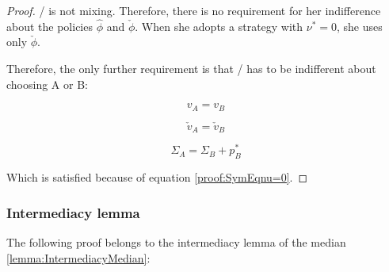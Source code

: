 \documentclass{article}
\theoremstyle{definition}
\begin{document}
\begin{proof}
\PI/ is not mixing. Therefore, there is no requirement for her indifference about the policies  $\hat{\phi}$ and $\check{\phi}$. When she adopts a strategy with $\nu^* = 0$, she uses only $\check{\phi}$.

Therefore, the only further requirement is that \PII/ has to be indifferent about choosing A or B:

\begin{equation}
    v_A = v_B
\end{equation}

\begin{equation}
    \check{v}_A = \check{v}_B
\end{equation}

\begin{equation}
    \Sigma_A = \Sigma_B + p^*_B
\end{equation}

Which is satisfied because of equation \ref{proof:SymEqnu=0}.

\end{proof}

\subsubsection{Intermediacy lemma}
\label{sec:IntermediacyMedian}

The following proof belongs to the intermediacy lemma of the median \ref{lemma:IntermediacyMedian}:
\end{document}
